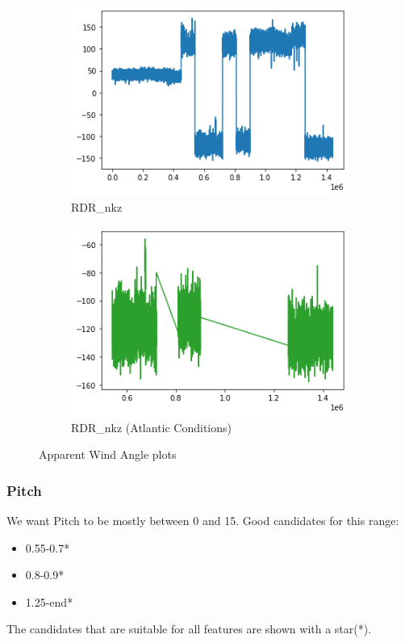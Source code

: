 \begin{figure}[h]
     \centering
     \begin{subfigure}[t]{0.49\textwidth}
         \centering
         \includegraphics[width=\textwidth]{figures/distributions/RDR-AWA.png}
         \caption{RDR\_nkz}
     \end{subfigure}
     \hfill
     \begin{subfigure}[t]{0.49\textwidth}
         \centering
         \includegraphics[width=\textwidth]{figures/distributions/RDR-atlantic-AWA.png}
         \caption{RDR\_nkz (Atlantic Conditions)}
     \end{subfigure}
        \label{fig:rdr-tws}
        \caption{Apparent Wind Angle plots}
\end{figure}

\clearpage
\subsubsection{Pitch}
We want Pitch to be mostly between 0 and 15. Good candidates for this range:
\begin{itemize}
    \item 0.55-0.7*
    \item 0.8-0.9*
    \item 1.25-end*
\end{itemize}
The candidates that are suitable for all features are shown with a star(*).

